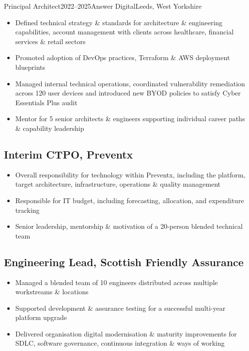 \documentclass{cv}
\begin{document}
\begin{experienceplain}{Principal Architect}{2022--2025}{Answer Digital}{Leeds, West Yorkshire}
\begin{itemize}
\item Defined technical strategy \& standards for architecture \& engineering capabilities, account
      management with clients across healthcare, financial services \& retail sectors
\item Promoted adoption of DevOps practices, Terraform \& AWS deployment blueprints
\item Managed internal technical operations, coordinated vulnerability remediation across 120 user
      devices and introduced new BYOD policies to satisfy Cyber Essentials Plus audit
\item Mentor for 5 senior architects \& engineers supporting individual career paths \& capability leadership
\end{itemize}


\subsection{Interim CTPO, Preventx} %
\begin{itemize}
\item Overall responsibility for technology within Preventx, including the platform,
      target architecture, infrastructure, operations \& quality management
\item Responsible for IT budget, including forecasting, allocation, and expenditure tracking
\item Senior leadership, mentorship \& motivation of a 20-person blended technical team
\end{itemize}

\subsection{Engineering Lead, Scottish Friendly Assurance} %
\begin{itemize}
\item Managed a blended team of 10 engineers distributed across multiple workstreams \& locations
\item Supported development \& assurance testing for a successful multi-year platform upgrade
\item Delivered organisation digital modernisation \& maturity improvements for SDLC, software
      governance, continuous integration \& ways of working
\end{itemize}


\end{experienceplain}
\end{document}
